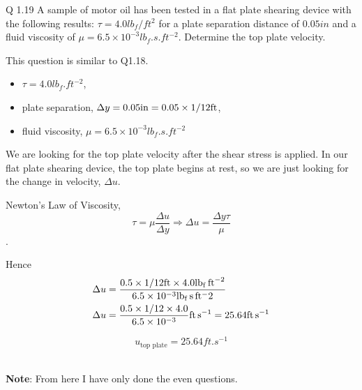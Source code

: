 
\begin{question}
  Q 1.19 A sample of motor oil has been tested in a flat plate shearing device with the following results: $\tau = 4.0 \si{lb_{f}/ft^2}$ for a plate separation distance of $0.05 \si{in}$ and a fluid viscosity of $\mu = 6.5 \times 10^{-3} \si{lb_f.s.ft^{-2}}$. Determine the top plate velocity.
\end{question}

\begin{solution} This question is similar to Q1.18.

  \begin{itemize}
    \item $\tau = 4.0 \si{lb_{f}.ft^{-2}}$,
    \item plate separation, $\Delta y = 0.05 \si{in} = 0.05 \x 1/12 \si{ft}$,
    \item fluid viscosity, $\mu = 6.5 \times 10^{-3} \si{lb_f.s.ft^{-2}}$
  \end{itemize}

  We are looking for the top plate velocity after the shear stress is applied. In our flat plate shearing device, the top plate begins at rest, so we are just looking for the change in velocity, $\Delta u$.

  Newton's Law of Viscosity,
  \begin{equation}
    \tau = \mu \frac{ \Delta u }{\Delta y} \Rightarrow \Delta u = \frac{ \Delta y \tau}{\mu}
  \end{equation}.

  Hence
  \begin{align*}
    \Delta u &= \frac{ 0.5 \x 1/12 \si{ft} \x 4.0 \si{lb_f.ft^{-2}} }{ 6.5 \x 10^{-3} \si{lb_f.s.ft{^-2}} } \\
    \Delta u &= \frac{ 0.5 \x 1/12 \x 4.0 }{ 6.5 \x 10^{-3}} \si{ft.s^{-1}} = 25.64 \si{ft.s^{-1}}
  \end{align*}

  \begin{equation*}
    \boxed{ u_{\text{top plate}} =  25.64 \si{ft.s^{-1}}}
  \end{equation*}
\end{solution}

~\\\noindent \textbf{Note}: From here I have only done the even questions.


